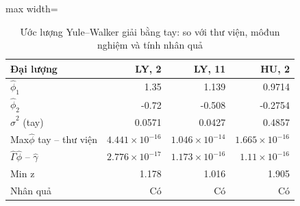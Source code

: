\begin{table}[H]
\centering\small
\caption{Ước lượng Yule–Walker giải bằng tay: so với thư viện, môđun nghiệm và tính nhân quả}\label{tab:tab_b11_07_yule_walker}
\begin{adjustbox}{max width=\linewidth}
\begin{tabular}{lrrr}
\toprule
Đại lượng & LY, 2 & LY, 11 & HU, 2 \\
\midrule
$\hat{\phi}_{1}$ & 1.35 & 1.139 & 0.9714 \\
$\hat{\phi}_{2}$ & -0.72 & -0.508 & -0.2754 \\
$\hat{\sigma}^{2}$ (tay) & 0.0571 & 0.0427 & 0.4857 \\
Max\textbar{}$\hat{\phi}$ tay – thư viện\textbar{} & $4.441\times10^{-16}$ & $1.046\times10^{-14}$ & $1.665\times10^{-16}$ \\
\textbar{}$\hat{\Gamma}\hat{\phi}$ – $\hat{\gamma}$\textbar{} & $2.776\times10^{-17}$ & $1.173\times10^{-16}$ & $1.11\times10^{-16}$ \\
Min \textbar{}z\textbar{} & 1.178 & 1.016 & 1.905 \\
Nhân quả & Có & Có & Có \\
\bottomrule
\end{tabular}
\end{adjustbox}
\end{table}
